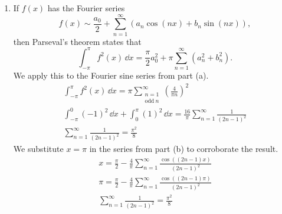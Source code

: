 {\begin{Solution}
\begin{enumerate}
\begin{gather*}
{        with $=$.}
      x - a = \frac{4}{\pi} 
      \sum_{\substack{n = 1 \\ \mathrm{odd}\ n}}^\infty
      \frac{ \cos(n a) }{ n^2 } 
      - \frac{4}{\pi} 
      \sum_{\substack{n = 1 \\ \mathrm{odd}\ n}}^\infty
      \frac{\cos(n x) }{ n^2 } \\
    \end{gather*}
    Now we have a Fourier cosine series.  The first sum on the right is the
    constant term.  If we choose $a = \pi / 2$ this sum vanishes since
    $\cos(n \pi / 2) = 0$ for odd integer $n$.
    \[
    \boxed{
      x = \frac{ \pi }{ 2 } - \frac{4}{\pi} 
      \sum_{\substack{n = 1 \\ \mathrm{odd}\ n}}^\infty
      \frac{\cos(n x) }{ n^2 } 
      }
    \]
  \item
    If $f(x)$ has the Fourier series
    \[ 
    f(x) \sim \frac{a_0}{2} + \sum_{n = 1}^\infty (a_n \cos(n x) + b_n \sin(n x)),
    \]
    then Parseval's theorem states that
    \[ 
    \int_{-\pi}^\pi f^2(x)\,\dd x = \frac{\pi}{2} a_0^2
    + \pi \sum_{n = 1}^\infty (a_n^2 + b_n^2).
    \]
    We apply this to the Fourier sine series from part (a).
    \begin{gather*}
      \int_{-\pi}^\pi f^2(x) \,\dd x = \pi 
      \sum_{\substack{n = 1 \\ \mathrm{odd}\ n}}^\infty
      \left( \frac{ 4 }{ \pi n } \right)^2 \\
      \int_{-\pi}^0 (-1)^2 \,\dd x + \int_0^\pi (1)^2 \,\dd x = \frac{ 16 }{ \pi }
      \sum_{n = 1}^\infty \frac{1}{(2n-1)^2} \\
      \boxed{
        \sum_{n = 1}^\infty \frac{1}{(2n-1)^2} = \frac{ \pi^2 }{ 8 }
        }
    \end{gather*}
    We substitute $x = \pi$ in the series from part (b) to corroborate the result.
    \begin{gather*}
      x = \frac{ \pi }{ 2 } - \frac{4}{\pi} 
      \sum_{n = 1}^\infty \frac{\cos((2n-1) x) }{ (2n-1)^2 } \\
      \pi = \frac{ \pi }{ 2 } - \frac{4}{\pi} 
      \sum_{n = 1}^\infty \frac{\cos((2n-1) \pi) }{ (2n-1)^2 } \\
      \sum_{n = 1}^\infty \frac{1}{(2n-1)^2} = \frac{ \pi^2 }{ 8 }
    \end{gather*}
  \end{enumerate}
\end{Solution}







}
